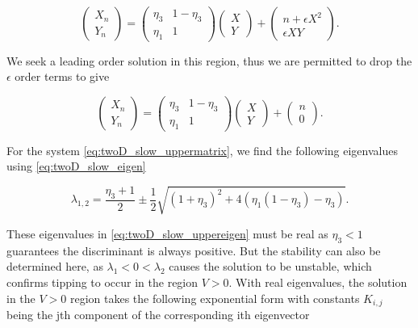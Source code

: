\begin{equation*}
\begin{pmatrix}
X_n\\
Y_n
\end{pmatrix}=
\begin{pmatrix}
\eta_3 & 1-\eta_3 \\ 
\eta_1 & 1
\end{pmatrix}
\begin{pmatrix}
X\\
Y
\end{pmatrix} +
\begin{pmatrix}
n+\epsilon X^2\\
\epsilon XY
\end{pmatrix}.
\end{equation*}

We seek a leading order solution in this region, thus we are permitted to drop the $\epsilon$ order terms to give 

\begin{equation}\label{eq:twoD_slow_uppermatrix}
\begin{pmatrix}
X_n\\
Y_n
\end{pmatrix}=
\begin{pmatrix}
\eta_3 & 1-\eta_3 \\ 
\eta_1 & 1
\end{pmatrix}
\begin{pmatrix}
X\\
Y
\end{pmatrix} +
\begin{pmatrix}
n\\
0
\end{pmatrix}.
\end{equation}

For the system \eqref{eq:twoD_slow_uppermatrix}, we find the following eigenvalues using \eqref{eq:twoD_slow_eigen}

\begin{equation}\label{eq:twoD_slow_uppereigen}
\lambda_{1,2}=\frac{\eta_3+1}{2}\pm\frac{1}{2}\sqrt{(1+\eta_3)^2+4(\eta_1(1-\eta_3)-\eta_3)}.
\end{equation}

These eigenvalues in \eqref{eq:twoD_slow_uppereigen} must be real as $\eta_3<1$ guarantees the discriminant is always positive. But the stability can also be determined here, as $\lambda_1<0<\lambda_2$ causes the solution to be unstable, which confirms tipping to occur in the region $V>0$. With real eigenvalues, the solution in the $V>0$ region takes the following exponential form with constants $K_{i,j}$ being the jth component of the corresponding ith eigenvector 

